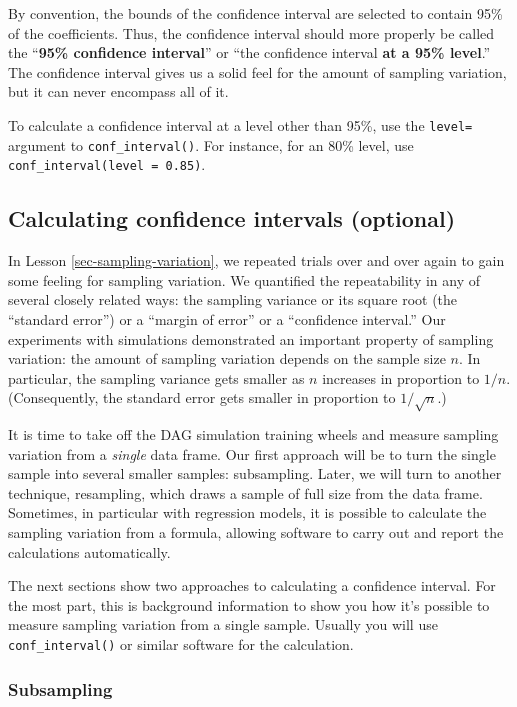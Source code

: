 \documentclass[
  letterpaper,
  DIV=11,
  numbers=noendperiod,
  oneside]{scrartcl}
\begin{document}
By convention, the bounds of the confidence interval are selected to
contain 95\% of the coefficients. Thus, the confidence interval should
more properly be called the ``\textbf{95\% confidence interval}'' or
``the confidence interval \textbf{at a 95\% level}.'' The confidence
interval gives us a solid feel for the amount of sampling variation, but
it can never encompass all of it.

To calculate a confidence interval at a level other than 95\%, use the
\texttt{level=} argument to \texttt{conf\_interval()}. For instance, for
an 80\% level, use \texttt{conf\_interval(level\ =\ 0.85)}.

\subsection{Calculating confidence intervals
(optional)}\label{sec-calculating-CI}

In Lesson \ref{sec-sampling-variation}, we repeated trials over and over
again to gain some feeling for sampling variation. We quantified the
repeatability in any of several closely related ways: the sampling
variance or its square root (the ``standard error'') or a ``margin of
error'' or a ``confidence interval.'' Our experiments with simulations
demonstrated an important property of sampling variation: the amount of
sampling variation depends on the sample size \(n\). In particular, the
sampling variance gets smaller as \(n\) increases in proportion to
\(1/n\). (Consequently, the standard error gets smaller in proportion to
\(1/\sqrt{n}\).)

It is time to take off the DAG simulation training wheels and measure
sampling variation from a \emph{single} data frame. Our first approach
will be to turn the single sample into several smaller samples:
subsampling. Later, we will turn to another technique, resampling, which
draws a sample of full size from the data frame. Sometimes, in
particular with regression models, it is possible to calculate the
sampling variation from a formula, allowing software to carry out and
report the calculations automatically.

The next sections show two approaches to calculating a confidence
interval. For the most part, this is background information to show you
how it's possible to measure sampling variation from a single sample.
Usually you will use \texttt{conf\_interval()} or similar software for
the calculation.

\subsubsection{Subsampling}\label{sec-subsampling}
\end{document}
